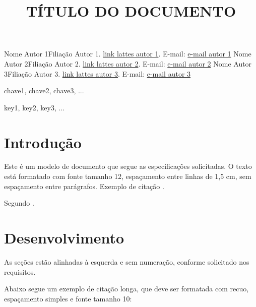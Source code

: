 \documentclass{wticifes}
\begin{document}
\onehalfspacing

\title{TÍTULO DO DOCUMENTO}
\maketitle
{Nome Autor 1}{Filiação Autor 1. \url{link lattes autor 1}. E-mail: \url{e-mail autor 1}}
{Nome Autor 2}{Filiação Autor 2. \url{link lattes autor 2}. E-mail: \url{e-mail autor 2}}
{Nome Autor 3}{Filiação Autor 3. \url{link lattes autor 3}. E-mail: \url{e-mail autor 3}}


\begin{resumo}
\lipsum[1]
\end{resumo}

\begin{palavraschave}
    chave1, chave2, chave3, ...
\end{palavraschave}

\vspace{0.5cm}
\begin{abstract}
\lipsum[1]
\end{abstract}

\begin{keywords}
    key1, key2, key3, ...
\end{keywords}

\section{Introdução}
Este é um modelo de documento que segue as especificações solicitadas. O texto está formatado com fonte tamanho 12, espaçamento entre linhas de 1,5 cm, sem espaçamento entre parágrafos. Exemplo de citação \cite{teste2023}.

Segundo .

\lipsum[1]

\section{Desenvolvimento}
As seções estão alinhadas à esquerda e sem numeração, conforme solicitado
nos requisitos.

\lipsum[1]

Abaixo segue um exemplo de citação longa, que deve ser formatada com recuo, espaçamento simples e fonte tamanho 10:
\end{document}
